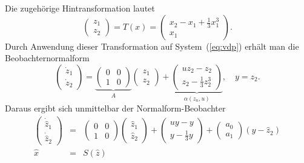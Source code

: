 Die zugehörige Hintransformation lautet
\begin{equation}
\left(\begin{array}{l}
z_{1}\\
z_{2}
\end{array}\right)=T(x)=\left(\begin{array}{c}
x_{2}-x_{1}+\frac{1}{3}x_{1}^{3}\\
x_{1}
\end{array}\right).\label{eq:vdp-hintransformation}
\end{equation}
Durch Anwendung dieser Transformation auf System~(\ref{eq:vdp})
erhält man die Beobachternormalform
\begin{equation}
\left(\begin{array}{l}
\dot{z}_{1}\\
\dot{z}_{2}
\end{array}\right)=\underbrace{\left(\begin{array}{cc}
0 & 0\\
1 & 0
\end{array}\right)}_{{\displaystyle A}}\left(\begin{array}{l}
z_{1}\\
z_{2}
\end{array}\right)+\underbrace{\left(\begin{array}{c}
uz_{2}-z_{2}\\
z_{2}-\frac{1}{3}z_{2}^{3}
\end{array}\right)}_{{\displaystyle \alpha(z_{n},u)}},\quad y=z_{2}.\label{eq:vdp-beobachternormalform}
\end{equation}
Daraus ergibt sich unmittelbar der Normalform-Beobachter
\begin{eqnarray*}
\left(\begin{array}{l}
\dot{\hat{z}}_{1}\\
\dot{\hat{z}}_{2}
\end{array}\right) & = & \left(\begin{array}{cc}
0 & 0\\
1 & 0
\end{array}\right)\left(\begin{array}{l}
\hat{z}_{1}\\
\hat{z}_{2}
\end{array}\right)+\left(\begin{array}{c}
uy-y\\
y-\frac{1}{3}y
\end{array}\right)+\left(\begin{array}{l}
a_{0}\\
a_{1}
\end{array}\right)(y-\hat{z}_{2})\\
\hat{x} & = & S(\hat{z})
\end{eqnarray*}
